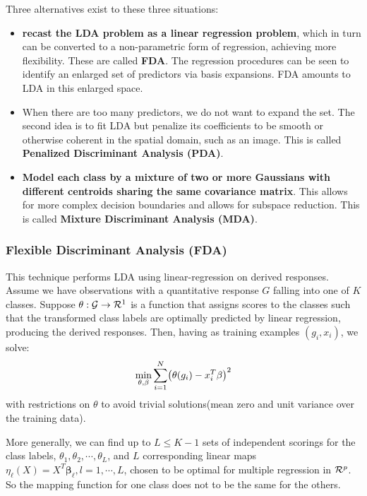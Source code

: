 \documentclass[12pt, letterpaper]{article}
\theoremstyle{definition}
\newcommand{\be}{\mathbf{\beta}}
\DeclarePairedDelimiter\autobracket{(}{)}
\newcommand{\br}[1]{\autobracket*{#1}}
\begin{document}
Three alternatives exist to these three situations:
\begin{itemize}
\item \textbf{recast the LDA problem as a linear regression problem}, which in turn can be converted to a non-parametric form of regression, achieving more flexibility. These are called \textbf{FDA}. The regression procedures can be seen to identify an enlarged set of predictors via basis expansions. FDA amounts to LDA in this enlarged space.
\item When there are too many predictors, we do not want to expand the set. The second idea is to fit LDA but penalize its coefficients to be smooth or otherwise coherent in the spatial domain, such as an image. This is called \textbf{Penalized Discriminant Analysis (PDA)}.
\item \textbf{Model each class by a mixture of two or more Gaussians with different centroids sharing the same covariance matrix}. This allows for more complex decision boundaries and allows for subspace reduction. This is called \textbf{Mixture Discriminant Analysis (MDA)}.
\end{itemize}

\subsubsection{Flexible Discriminant Analysis (FDA)}
This technique performs LDA using linear-regression on derived responses.
Assume we have observations with a quantitative response $G$ falling into one of $K$ classes. Suppose $\theta:\CMcal{G} \rightarrow \CMcal{R}^1$ is a function that assigns scores to the classes such that the transformed class labels are optimally predicted by linear regression, producing the derived responses. Then, having as training examples $(g_i, x_i)$, we solve:
\begin{equation}
\min_{\theta, \be} \sum_{i=1}^N \br{\theta(g_i)-x_i^T\be}^2
\end{equation}
with restrictions on $\theta$ to avoid trivial solutions(mean zero and unit variance over the training data).

More generally, we can find up to $L \le K-1 $ sets of independent scorings for the class labels, $\theta_1, \theta_2, \cdots , \theta_L$, and $L$ corresponding linear maps $\eta_\ell(X) = X^T \be_\ell, l = 1,\cdots, L$, chosen to be optimal for multiple regression in $\CMcal{R}^p$. So the mapping function for one class does not to be the same for the others.
\end{document}
